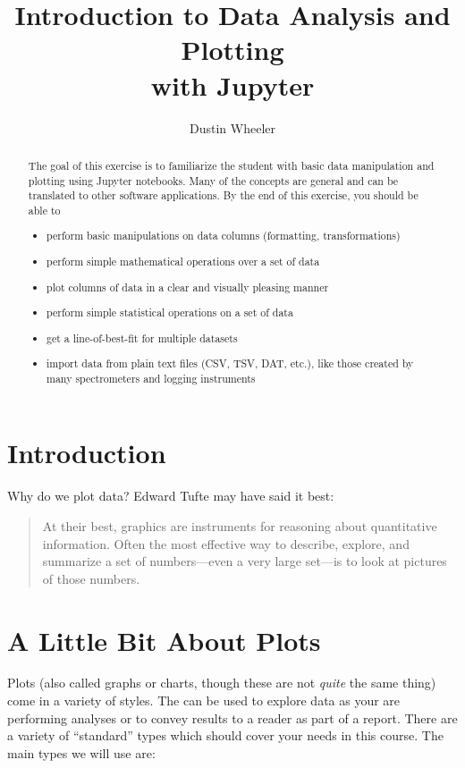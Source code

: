 \documentclass[nobib,nofonts,nols,nohyper]{tufte-handout}
\title{Introduction to Data Analysis and Plotting \\with Jupyter}
\author{Dustin Wheeler}
\begin{document}
\maketitle

\begin{abstract}
	\noindent
	The goal of this exercise is to familiarize the student with basic data manipulation and plotting using Jupyter notebooks. 
	Many of the concepts are general and can be translated to other software applications. 
	By the end of this exercise, you should be able to 
	\begin{itemize}
		\item perform basic manipulations on data columns (formatting, transformations) 
		\item perform simple mathematical operations over a set of data 
		\item plot columns of data in a clear and visually pleasing manner
		\item perform simple statistical operations on a set of data
		\item get a line-of-best-fit for multiple datasets
		\item import data from plain text files (CSV, TSV, DAT, etc.), like those created by many spectrometers and logging instruments
	\end{itemize}
\end{abstract}

\section{Introduction} %
\label{sec:intro}

Why do we plot data? Edward Tufte may have said it best:

\begin{quote}
	At their best, graphics are instruments for reasoning about quantitative information. 
	Often the most effective way to describe, explore, and summarize a set of numbers---even a very large set---is to look at pictures of those numbers.
\end{quote}

\section{A Little Bit About Plots} %
\label{sec:a-little-bit-about-plots}

Plots (also called graphs or charts, though these are not \emph{quite} the same thing) come in a variety of styles. 
The can be used to explore data as your are performing analyses or to convey results to a reader as part of a report. 
There are a variety of ``standard'' types which should cover your needs in this course. 
The main types we will use are:
\end{document}
